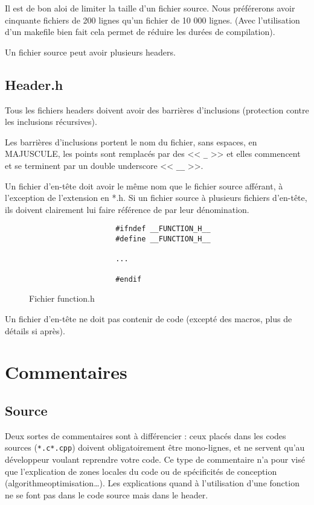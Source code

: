 			Il est de bon aloi de limiter la taille d'un fichier source. Nous préférerons avoir cinquante fichiers de 200 lignes qu'un fichier de 10 000 lignes. (Avec l'utilisation d'un makefile bien fait cela permet de réduire les durées de compilation).

			Un fichier source peut avoir plusieurs headers.

		\subsection{Header.h}
			Tous les fichiers headers doivent avoir des barrières d'inclusions (protection contre les inclusions récursives).
			
			Les barrières d'inclusions portent le nom du fichier, sans espaces, en MAJUSCULE, les points sont remplacés par des << \verb+_+ >> et elles commencent et se terminent par un double underscore << \verb+__+ >>.
		
			Un fichier d'en-tête doit avoir le même nom que le fichier source afférant, à l'exception de l'extension en *.h. Si un fichier source à plusieurs fichiers d'en-tête, ils doivent clairement lui faire référence de par leur dénomination.
			
			\begin{figure}[H]
				\begin{changemargin}{-2.5cm}{-2.5cm}
				\begin{tcolorbox}
				\begin{verbatim}
					#ifndef __FUNCTION_H__
					#define __FUNCTION_H__

					...

					#endif
				\end{verbatim}
				\end{tcolorbox}
				\end{changemargin}
				\caption{Fichier function.h}
			\end{figure}

			Un fichier d'en-tête ne doit pas contenir de code (excepté des macros, plus de détails si après).

	\section{Commentaires}
		\subsection{Source}
			Deux sortes de commentaires sont à différencier : ceux placés dans les codes sources (\verb+*.c+\/\verb+*.cpp+) doivent obligatoirement être mono-lignes, et ne servent qu'au développeur voulant reprendre votre code. Ce type de commentaire n'a pour visé que l'explication de zones locales du code ou de spécificités de conception (algorithme\/optimisation\/\dots). Les explications quand à l'utilisation d'une fonction ne se font pas dans le code source mais dans le header.

